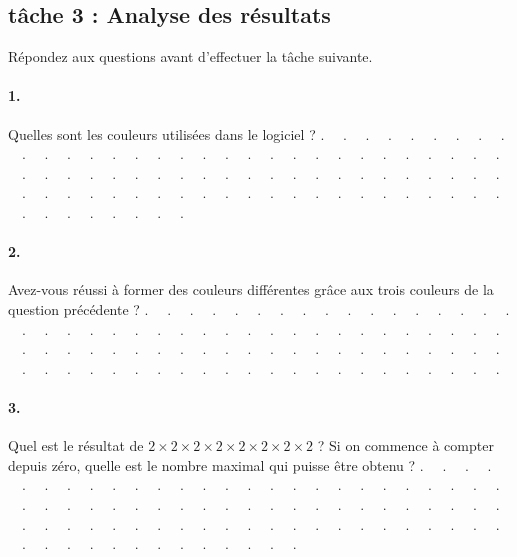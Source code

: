 \documentclass[12pt,a4paper,notitlepage]{article}
\begin{document}
\subsection*{tâche 3 : Analyse des résultats}
\begin{bclogo}[couleur=yellow!5, arrondi=0.1, logo=\bccrayon, nobreak=true]{}
	Répondez aux questions avant d'effectuer la tâche suivante.
\end{bclogo}
\paragraph{1.} Quelles sont les couleurs utilisées dans le logiciel ? \newline
\noindent . \ \ . \ \ . \ \ . \ \ . \ \ . \ \ . \ \ . \ \ . \ \ . \ \ . \ \ . \ \ .
\ \ . \ \ . \ \ . \ \ . \ \ . \ \ . \ \ . \ \ . \ \ . \ \ . \ \ . \ \ . \ \ . \ \ . 
\ \ . \ \ . \ \ . \ \ . \ \ . \ \ . \ \ . \ \ . \ \ . \ \ . \ \ . \ \ . \ \ . \ \ . 
\ \ . \ \ . \ \ . \ \ . \ \ . \ \ . \ \ . \ \ . \ \ . \ \ . \ \ . \ \ . \ \ . \ \ . 
\ \ . \ \ . \ \ . \ \ . \ \ . \ \ . \ \ . \ \ . \ \ . \ \ . \ \ . \ \ . \ \ . \ \ . 
\ \ . \ \ . \ \ . \ \ . \ \ . \ \ . \ \ . \ \ . \ \ . \ \ . \ \ . \ \ . \ \ . \ \ . 

\paragraph{2.} Avez-vous réussi à former des couleurs différentes grâce aux trois couleurs de la question précédente ?
\noindent . \ \ . \ \ . \ \ . \ \ . \ \ . \ \ . \ \ . \ \ . \ \ . \ \ . \ \ . \ \ .
\ \ . \ \ . \ \ . \ \ . \ \ . \ \ . \ \ . \ \ . \ \ . \ \ . \ \ . \ \ . \ \ . \ \ . 
\ \ . \ \ . \ \ . \ \ . \ \ . \ \ . \ \ . \ \ . \ \ . \ \ . \ \ . \ \ . \ \ . \ \ . 
\ \ . \ \ . \ \ . \ \ . \ \ . \ \ . \ \ . \ \ . \ \ . \ \ . \ \ . \ \ . \ \ . \ \ . 
\ \ . \ \ . \ \ . \ \ . \ \ . \ \ . \ \ . \ \ . \ \ . \ \ . \ \ . \ \ . \ \ . \ \ . 
\ \ . \ \ . \ \ . \ \ . \ \ . \ \ . \ \ . \ \ . \ \ . \ \ . \ \ . \ \ . \ \ . \ \ . 

\paragraph{3.} Quel est le résultat de $2 \times 2 \times 2 \times 2 \times 2 \times 2 \times 2 \times 2$ ? Si on commence à compter depuis zéro, quelle est le nombre maximal qui puisse être obtenu ?
\noindent . \ \ . \ \ . \ \ . \ \ . \ \ . \ \ . \ \ . \ \ . \ \ . \ \ . \ \ . \ \ .
\ \ . \ \ . \ \ . \ \ . \ \ . \ \ . \ \ . \ \ . \ \ . \ \ . \ \ . \ \ . \ \ . \ \ . 
\ \ . \ \ . \ \ . \ \ . \ \ . \ \ . \ \ . \ \ . \ \ . \ \ . \ \ . \ \ . \ \ . \ \ . 
\ \ . \ \ . \ \ . \ \ . \ \ . \ \ . \ \ . \ \ . \ \ . \ \ . \ \ . \ \ . \ \ . \ \ . 
\ \ . \ \ . \ \ . \ \ . \ \ . \ \ . \ \ . \ \ . \ \ . \ \ . \ \ . \ \ . \ \ . \ \ . 
\ \ . \ \ . \ \ . \ \ . \ \ . \ \ . \ \ . \ \ . \ \ . \ \ . \ \ . \ \ . \ \ . \ \ . 
\end{document}
